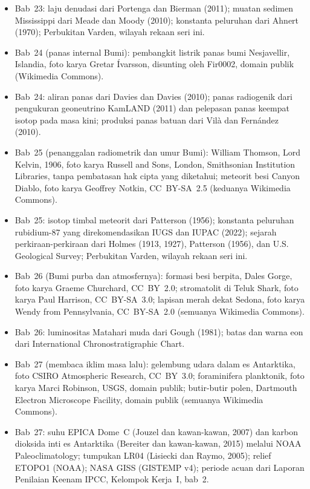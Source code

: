 \begin{itemize}
  \item Bab~23: laju denudasi dari Portenga dan Bierman (2011); muatan sedimen Mississippi dari Meade dan Moody (2010); konstanta peluruhan dari Ahnert (1970); Perbukitan Varden, wilayah rekaan seri ini.
  \item Bab~24 (panas internal Bumi): pembangkit listrik panas bumi Nesjavellir, Islandia, foto karya Gretar Ívarsson, disunting oleh Fir0002, domain publik (Wikimedia Commons).
  \item Bab~24: aliran panas dari Davies dan Davies (2010); panas radiogenik dari pengukuran geoneutrino KamLAND (2011) dan pelepasan panas keempat isotop pada masa kini; produksi panas batuan dari Vilà dan Fernández (2010).
  \item Bab~25 (penanggalan radiometrik dan umur Bumi): William Thomson, Lord Kelvin, 1906, foto karya Russell and Sons, London, Smithsonian Institution Libraries, tanpa pembatasan hak cipta yang diketahui; meteorit besi Canyon Diablo, foto karya Geoffrey Notkin, CC~BY-SA~2.5 (keduanya Wikimedia Commons).
  \item Bab~25: isotop timbal meteorit dari Patterson (1956); konstanta peluruhan rubidium-87 yang direkomendasikan IUGS dan IUPAC (2022); sejarah perkiraan-perkiraan dari Holmes (1913, 1927), Patterson (1956), dan U.S. Geological Survey; Perbukitan Varden, wilayah rekaan seri ini.
  \item Bab~26 (Bumi purba dan atmosfernya): formasi besi berpita, Dales Gorge, foto karya Graeme Churchard, CC~BY~2.0; stromatolit di Teluk Shark, foto karya Paul Harrison, CC~BY-SA~3.0; lapisan merah dekat Sedona, foto karya Wendy from Pennsylvania, CC~BY-SA~2.0 (semuanya Wikimedia Commons).
  \item Bab~26: luminositas Matahari muda dari Gough (1981); batas dan warna eon dari International Chronostratigraphic Chart.
  \item Bab~27 (membaca iklim masa lalu): gelembung udara dalam es Antarktika, foto CSIRO Atmospheric Research, CC~BY~3.0; foraminifera planktonik, foto karya Marci Robinson, USGS, domain publik; butir-butir polen, Dartmouth Electron Microscope Facility, domain publik (semuanya Wikimedia Commons).
  \item Bab~27: suhu EPICA Dome~C (Jouzel dan kawan-kawan, 2007) dan karbon dioksida inti es Antarktika (Bereiter dan kawan-kawan, 2015) melalui NOAA Paleoclimatology; tumpukan LR04 (Lisiecki dan Raymo, 2005); relief ETOPO1 (NOAA); NASA GISS (GISTEMP v4); periode acuan dari Laporan Penilaian Keenam IPCC, Kelompok Kerja~I, bab~2.

\end{itemize}
